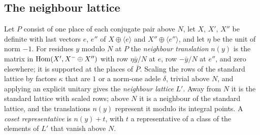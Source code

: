 \subsection{The neighbour lattice}\label{ss:neighbour}
Let $P$ consist of one place of each conjugate pair above $N$, let $X$, $X'$, $X''$ be definite with last vectors $e$, $e''$
of $X\oplus\langle e\rangle$ and $X''\oplus\langle e''\rangle$, and let $\eta$ be the unit of norm $-1$. For residues $y$ modulo $N$ at $P$ the
\emph{neighbour translation} $n(y)$ is the matrix in $\operatorname{Hom}(X',X^-\oplus X'')$ with row $\eta\bar y/N$ at $e$, row $-\bar y/N$ at $e''$, and
zero elsewhere; it is supported at the places of $\bar P$. Scaling the rows of the standard lattice by factors $\kappa$ that
are $1$ or a norm-one adele $\delta$, trivial above $N$, and applying an explicit unitary gives the \emph{neighbour lattice}
$L'$. Away from $N$ it is the standard lattice with scaled rows; above $N$ it is a neighbour of the standard lattice, and the
translations $n(y)$ represent it modulo its integral points. A \emph{coset representative} is $n(y)+t$, with $t$ a
representative of a class of the elements of $L'$ that vanish above $N$.
